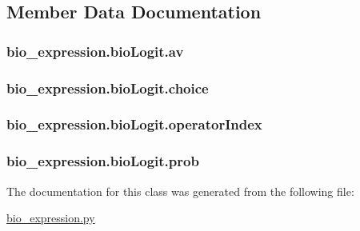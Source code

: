 \subsection{Member Data Documentation}
\hypertarget{classbio__expression_1_1bio_logit_acf8d45c3bf980e2070c2003cf906f305}{
\subsubsection[{av}]{\setlength{\rightskip}{0pt plus 5cm}bio\+\_\+expression.\+bio\+Logit.\+av}}\label{classbio__expression_1_1bio_logit_acf8d45c3bf980e2070c2003cf906f305}
\hypertarget{classbio__expression_1_1bio_logit_a8ab839cd1684c1d3171dc28018fa9fc6}{
\subsubsection[{choice}]{\setlength{\rightskip}{0pt plus 5cm}bio\+\_\+expression.\+bio\+Logit.\+choice}}\label{classbio__expression_1_1bio_logit_a8ab839cd1684c1d3171dc28018fa9fc6}
\hypertarget{classbio__expression_1_1bio_logit_a08e2231bfabc66c1a35cb3a932d2fc45}{
\subsubsection[{operator\+Index}]{\setlength{\rightskip}{0pt plus 5cm}bio\+\_\+expression.\+bio\+Logit.\+operator\+Index}}\label{classbio__expression_1_1bio_logit_a08e2231bfabc66c1a35cb3a932d2fc45}
\hypertarget{classbio__expression_1_1bio_logit_ad5fd23e6737a77f2b75ef3efea466a93}{
\subsubsection[{prob}]{\setlength{\rightskip}{0pt plus 5cm}bio\+\_\+expression.\+bio\+Logit.\+prob}}\label{classbio__expression_1_1bio_logit_ad5fd23e6737a77f2b75ef3efea466a93}


The documentation for this class was generated from the following file\+:\begin{DoxyCompactItemize}
\item 
\hyperlink{bio__expression_8py}{bio\+\_\+expression.\+py}\end{DoxyCompactItemize}
